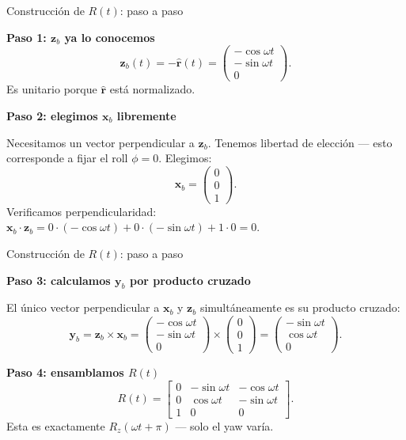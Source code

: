 \documentclass[11pt]{beamer}
\begin{document}
\begin{frame}{Construcción de \(R(t)\): paso a paso}

\textbf{Paso 1: \(\bm{z}_b\) ya lo conocemos}
\[
  \bm{z}_b(t) = -\hat{\bm{r}}(t) =
  \begin{pmatrix}-\cos\omega t \\ -\sin\omega t \\ 0\end{pmatrix}.
\]
Es unitario porque \(\hat{\bm{r}}\) está normalizado.

\medskip
\textbf{Paso 2: elegimos \(\bm{x}_b\) libremente}

Necesitamos un vector perpendicular a \(\bm{z}_b\). Tenemos libertad
de elección — esto corresponde a fijar el roll \(\phi = 0\).
Elegimos:
\[
  \bm{x}_b = \begin{pmatrix}0\\0\\1\end{pmatrix}.
\]
Verificamos perpendicularidad:
\(\bm{x}_b \cdot \bm{z}_b = 0\cdot(-\cos\omega t) + 0\cdot(-\sin\omega t)
+ 1\cdot 0 = 0\). \checkmark

\end{frame}



\begin{frame}{Construcción de \(R(t)\): paso a paso}

\medskip
\textbf{Paso 3: calculamos \(\bm{y}_b\) por producto cruzado}

El único vector perpendicular a \(\bm{x}_b\) y \(\bm{z}_b\)
simultáneamente es su producto cruzado:
\[
  \bm{y}_b = \bm{z}_b \times \bm{x}_b =
  \begin{pmatrix}-\cos\omega t \\ -\sin\omega t \\ 0\end{pmatrix}
  \times
  \begin{pmatrix}0\\0\\1\end{pmatrix}
  =
  \begin{pmatrix}-\sin\omega t \\ \cos\omega t \\ 0\end{pmatrix}.
\]

\medskip
\textbf{Paso 4: ensamblamos \(R(t)\)}
\[
  R(t) =
  \begin{bmatrix}
    0 & -\sin\omega t & -\cos\omega t \\
    0 &  \cos\omega t & -\sin\omega t \\
    1 &  0            &  0
  \end{bmatrix}.
\]
Esta es exactamente \(R_z(\omega t + \pi)\) — solo el yaw varía.

\end{frame}
\end{document}
